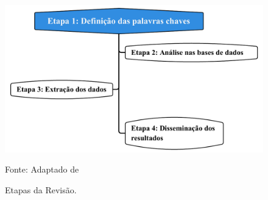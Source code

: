 \begin{figure}[H]
	\centering
	\caption{Etapas da Revisão.}
	\label{fig:rsl}
	\includegraphics[width=0.9\linewidth]{Revisao/Figuras/RSL}
	
	Fonte: Adaptado de 
\end{figure}


